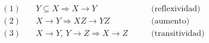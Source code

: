 \documentclass[preview]{standalone}
\begin{document}
\begin{align*}
(1) & \quad  Y  \subseteq X  \Rightarrow X\rightarrow Y  &\quad\quad  \text{(reflexividad)}\\
(2) & \quad  X\rightarrow Y    \Rightarrow XZ\rightarrow YZ  &\quad\quad  \text{(aumento)}\\
(3) & \quad  X\rightarrow Y\text{, }  Y\rightarrow Z   \Rightarrow X\rightarrow Z  &\quad\quad  \text{(transitividad)}\\
\end{align*}
\end{document}
